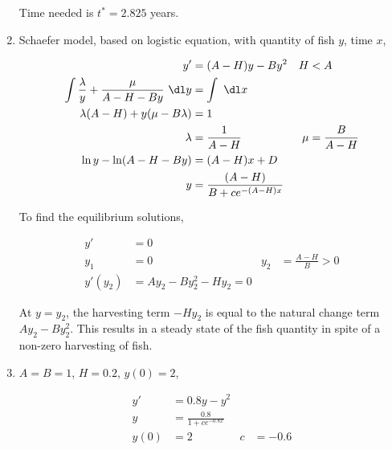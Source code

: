 \begin{enumerate}
          Time needed is $ t^{*} = 2.825 $ years.

    \item Schaefer model, based on logistic equation, with quantity of fish $ y $,
          time $ x $,

          \begin{align}
              y'                               & = (A-H)y - By^{2}                &
              H                                & < A                                \\
              \int \frac{\lambda}{y} + \frac{\mu}{A-H -By}\ \dl y
                                               & = \int\ \dl x                      \\
              \lambda(A-H) + y(\mu - B\lambda) & = 1                                \\
              \lambda                          & = \frac{1}{A-H}                  &
              \mu                              & = \frac{B}{A-H}                    \\
              \ln y - \ln (A-H - By)           & = (A-H)x + D                       \\
              y                                & = \frac{(A-H)}{B + ce^{-(A-H)x}}
          \end{align}

          To find the equilibrium solutions,

          \begin{align}
              y'        & = 0                                  \\
              y_{1}     & = 0                                &
              y_{2}     & = \frac{A-H}{B} > 0                  \\
              y'(y_{2}) & = Ay_{2} - By_{2}^{2} - Hy_{2} = 0
          \end{align}

          At $ y = y_{2} $, the harvesting term $ -Hy_{2} $ is equal to the natural
          change term $ Ay_{2} - By_{2}^{2} $. This results in a steady state of the
          fish quantity in spite of a non-zero harvesting of fish.

    \item $ A = B = 1 $, $ H = 0.2 $, $ y(0) = 2 $,

          \begin{align}
              y'   & = 0.8y - y^{2}                            \\
              y    & = \frac{0.8}{1 + ce^{-0.8x}}              \\
              y(0) & = 2                          & c & = -0.6
          \end{align}


\end{enumerate}
